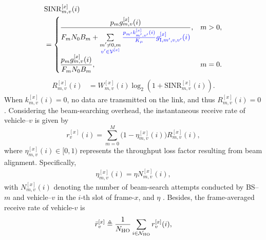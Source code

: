 \documentclass[conference, a4paper]{IEEEtran}
\newcommand{\rev}[1]{\textcolor{revisioncolor}{{}#1}}
\newif\ifshowdeletions
\newcommand{\currentdel}[1]{\ifshowdeletions\textcolor{deletioncolor}{\sout{#1}}\fi}
\theoremstyle{remark}
\begin{document}
\currentdel{By substituting the expressions for power, bandwidth and interference, the SINR term simplifies to}
\begin{equation}
    \begin{aligned}
        & \mathrm{SINR}_{m,v}^{[x]}(i) \\
        & = 
        \begin{cases}
            \displaystyle
            \frac{ p_m g_{m,v}^{[x]}(i)}
            {F_m N_0 B_m 
             + \sum\limits_{\substack{m'\neq 0,m\\\rev{v'\in\mathcal V^{[x]}}}}
               \currentdel{\ensuremath{\frac{k_{m'}^{[x]}(i)}{K_\mu}p_{m'}g_{{\rm I},m',v}^{[x]}(i)}}\rev{\frac{p_{m'}k_{m',v'}^{[x]}(i)}{K_\mu}
               g_{{\rm I},m',v,v'}^{[x]}(i)}}, 
            & m>0, \\[2ex]
            \displaystyle
            \frac{ p_m g_{m,v}^{[x]}(i)}{F_m N_0 B_m}, 
            & m=0.
        \end{cases}
    \end{aligned}
    \label{eq:SINR simplified}
\end{equation}
\currentdel{Based on the Shannon-Hartley theorem, the instantaneous achievable rate of this link is expressed as}
\begin{align}
    R_{m,v}^{[x]}(i) & = W_{m,v}^{[x]}(i) \log_2 \left( 1 + \mathrm{SINR}_{m,v}^{[x]}(i) \right).
    \label{eq:instantaneous link achievable rate}
\end{align}
\rev{When $k_{m,v}^{[x]}(i)=0$, no data are transmitted on the link, and thus $R_{m,v}^{[x]}(i)=0$.}
Considering the beam-searching overhead, the instantaneous receive rate of vehicle–$v$ is given by
\begin{equation}
    r_{v}^{[x]}(i) = \sum_{m=0}^M \bigl(1-\eta_{m,v}^{[x]}(i) \bigl)R_{m,v}^{[x]}(i),
    \label{eq:instantaneous veh receive rate}
\end{equation}
where $\eta_{m,v}^{[x]}(i) \in [0,1)$ represents the throughput loss factor resulting from beam alignment. Specifically,
\begin{align}
\eta_{m,v}^{[x]}(i) = \eta N_{m,v}^{[x]}(i),
\end{align}
with $N_{m,v}^{[x]}(i)$ denoting the number of beam-search attempts conducted by BS–$m$ and vehicle–$v$ in the $i$-th slot of frame-$x$, and $\eta$ \currentdel{representing the ratio of OFDM symbols consumed by once beam search to the total number of OFDM symbols per slot}.
Besides, the frame-averaged receive rate of vehicle-$v$ is 
\begin{equation}
    \bar{r}_v^{[x]} \triangleq  \frac{1}{N_{\rm HO}}\sum_{ i \in \mathcal{N}_{\rm HO}}r_{v}^{[x]}(i),
    \label{eq:frame-averaged veh receive rate}
\end{equation}
\end{document}
